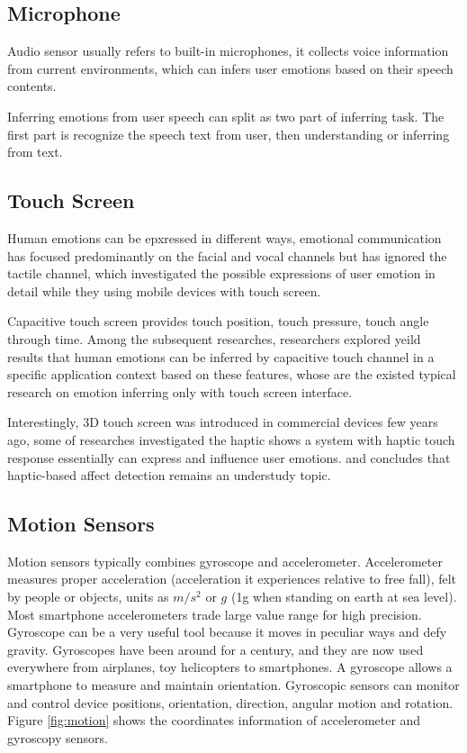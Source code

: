 \subsection{Microphone}\label{subsec:audio}
Audio sensor usually refers to built-in microphones, it collects voice information from current environments, which can infers user emotions based on their speech contents.

Inferring emotions from user speech can split as two part of inferring task. The first part is recognize the speech text from user, then understanding or inferring from text.


\subsection{Touch Screen}\label{subsec:touch}

Human emotions can be epxressed in different ways, emotional communication has focused predominantly on the facial and vocal channels but has ignored the tactile channel\cite{hertenstein2009communication}, which investigated the possible expressions of user emotion in detail while they using mobile devices with touch screen.

Capacitive touch screen provides touch position, touch pressure, touch angle through time. Among the subsequent researches\cite{Gao2012, Shah2015, Mottelson2016, bhattacharya2017predictive}, researchers explored yeild results that human emotions can be inferred by capacitive touch channel in a specific application context based on these features, whose are the existed typical research on emotion inferring only with touch screen interface.

Interestingly, 3D touch screen was introduced in commercial devices few years ago, some of researches investigated the haptic  \cite{Eid2016} 
\cite{Mazzoni2016, Lentini2017} shows a system with haptic touch response essentially can express and influence user emotions. and \cite{Bhattacharya2017} concludes that haptic-based affect detection remains an understudy topic.

\subsection{Motion Sensors}\label{subsec:motion}

Motion sensors typically combines gyroscope and accelerometer. Accelerometer measures proper acceleration (acceleration it experiences relative to free fall), felt by people or objects, units as $m/s^2$ or $g$ (1g when standing on earth at sea level). Most smartphone accelerometers trade large value range for high precision. Gyroscope can be a very useful tool because it moves in peculiar ways and defy gravity. Gyroscopes have been around for a century, and they are now used everywhere from airplanes, toy helicopters to smartphones. A gyroscope allows a smartphone to measure and maintain orientation. Gyroscopic sensors can monitor and control device positions, orientation, direction, angular motion and rotation. Figure \ref{fig:motion} shows the coordinates information of accelerometer and gyroscopy sensors.

